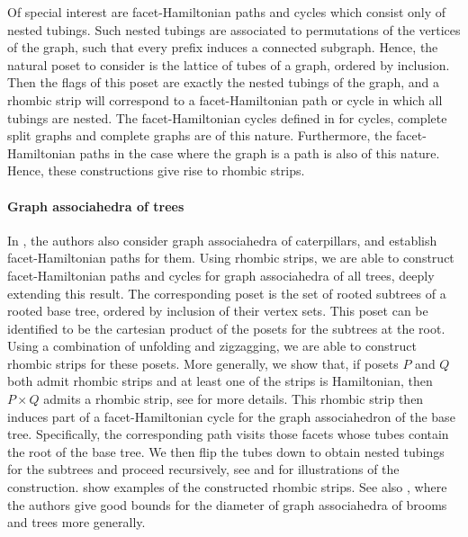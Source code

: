 \documentclass[fontsize=11pt,a4paper,DIV=12]{scrartcl}
\begin{document}
Of special interest are facet-Hamiltonian paths and cycles which consist only of nested tubings. Such nested tubings are associated to permutations of the vertices of the graph, such that every prefix induces a connected subgraph. Hence, the natural poset to consider is the lattice of tubes of a graph, ordered by inclusion. Then the flags of this poset are exactly the nested tubings of the graph, and a rhombic strip will correspond to a facet-Hamiltonian path or cycle in which all tubings are nested. The facet-Hamiltonian cycles defined in \cite{facethamiltonicity} for cycles, complete split graphs and complete graphs are of this nature. Furthermore, the facet-Hamiltonian paths in the case where the graph is a path is also of this nature. Hence, these constructions give rise to rhombic strips.

\paragraph{Graph associahedra of trees}
In \cite{facethamiltonicity}, the authors also consider graph associahedra of caterpillars, and establish facet-Hamiltonian paths for them. Using rhombic strips, we are able to construct facet-Hamiltonian paths and cycles for graph associahedra of all trees, deeply extending this result. The corresponding poset is the set of rooted subtrees of a rooted base tree, ordered by inclusion of their vertex sets. This poset can be identified to be the cartesian product of the posets for the subtrees at the root. Using a combination of unfolding and zigzagging, we are able to construct rhombic strips for these posets. More generally, we show that, if posets $P$ and $Q$ both admit rhombic strips and at least one of the strips is Hamiltonian, then $P\times Q$ admits a rhombic strip, see  for more details. This rhombic strip then induces part of a facet-Hamiltonian cycle for the graph associahedron of the base tree. Specifically, the corresponding path visits those facets whose tubes contain the root of the base tree. We then flip the tubes down to obtain nested tubings for the subtrees and proceed recursively, see  and  for illustrations of the construction.  show examples of the constructed rhombic strips. See also \cite{Broom_associahedra_diameter, Tree_associahedra_diameter}, where the authors give good bounds for the diameter of graph associahedra of brooms and trees more generally.
\end{document}
